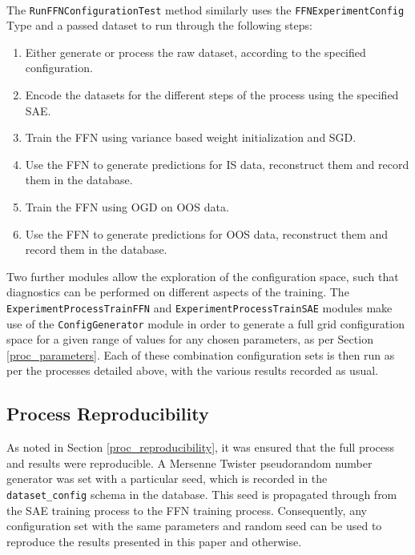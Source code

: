 \documentclass[a4paper,11pt,oneside]{article}
\theoremstyle{plain}
\theoremstyle{definition}
\begin{document}
	~\\
	The \texttt{RunFFNConfigurationTest} method similarly uses the \texttt{FFNExperimentConfig} Type and a passed dataset to run through the following steps:
	\begin{enumerate}
		\item Either generate or process the raw dataset, according to the specified configuration.
		\item Encode the datasets for the different steps of the process using the specified SAE.
		\item Train the FFN using variance based weight initialization and SGD.
		\item Use the FFN to generate predictions for IS data, reconstruct them and record them in the database.
		\item Train the FFN using OGD on OOS data.
		\item Use the FFN to generate predictions for OOS data, reconstruct them and record them in the database.
	\end{enumerate}
	
	Two further modules allow the exploration of the configuration space, such that diagnostics can be performed on different aspects of the training. 	The \texttt{ExperimentProcessTrainFFN} \citep{DCExperimentProcessTrainFFN} and \texttt{ExperimentProcessTrainSAE} \citep{DCExperimentProcessTrainSAE} modules make use of the \texttt{ConfigGenerator} module \citep{DCGenerator} in order to generate a full grid configuration space for a given range of values for any chosen parameters, as per Section \ref{proc_parameters}. Each of these combination configuration sets is then run as per the processes detailed above, with the various results recorded as usual. 

	\subsection{Process Reproducibility}
	
	As noted in Section \ref{proc_reproducibility}, it was ensured that the full process and results were reproducible. A Mersenne Twister pseudorandom number generator was set with a particular seed, which is recorded in the \texttt{dataset\_config} schema in the database. This seed is propagated through from the SAE training process to the FFN training process. Consequently, any configuration set with the same parameters and random seed can be used to reproduce the results presented in this paper and otherwise.
	
\end{document}
